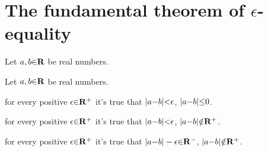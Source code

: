 \section{The fundamental theorem of $\epsilon$-equality}

 Let $a,b \p\in \R$ be real numbers. \par
{}

\vs
\lemma Let $a,b \p\in \R$ be real numbers. \par
    for every positive $\epsilon\p\in \R^+$ it's true that $\a|a \p- b\a| \p< \epsilon$,  $\a|a \p- b\a| \p\leq 0$. \par
    for every positive $\epsilon\p\in \R^+$ it's true that $\a|a \p- b\a| \p< \epsilon$,  $\a|a \p- b\a| \p\notin \R^+$. \par
    for every positive $\epsilon\p\in \R^+$ it's true that $\a|a \p- b\a| - \epsilon \p\in \R^-$,  $\a|a \p- b\a| \p\notin \R^+$. \par

